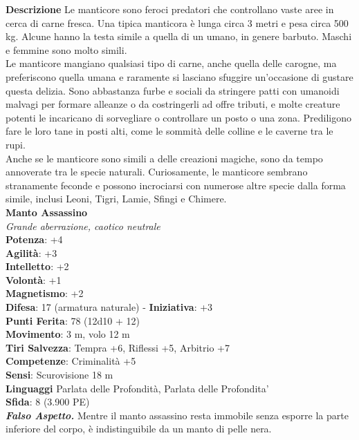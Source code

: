 \begin{multicols}{2}
\textbf{Descrizione}
Le manticore sono feroci predatori che controllano vaste aree in cerca di carne fresca. Una tipica manticora è lunga circa 3 metri e pesa circa 500 kg. Alcune hanno la testa simile a quella di un umano, in genere barbuto. Maschi e femmine sono molto simili.\\

Le manticore mangiano qualsiasi tipo di carne, anche quella delle carogne, ma preferiscono quella umana e raramente si lasciano sfuggire un’occasione di gustare questa delizia. Sono abbastanza furbe e sociali da stringere patti con umanoidi malvagi per formare alleanze o da costringerli ad offre tributi, e molte creature potenti le incaricano di sorvegliare o controllare un posto o una zona. Prediligono fare le loro tane in posti alti, come le sommità delle colline e le caverne tra le rupi.\\

Anche se le manticore sono simili a delle creazioni magiche, sono da tempo annoverate tra le specie naturali. Curiosamente, le manticore sembrano stranamente feconde e possono incrociarsi con numerose altre specie dalla forma simile, inclusi Leoni, Tigri, Lamie, Sfingi e Chimere.\\

\medskip\textbf{Manto Assassino}\\
\emph{Grande aberrazione, caotico neutrale}\\
\textbf{Potenza}: +4\\
\textbf{Agilità}: +3\\
\textbf{Intelletto}: +2\\
\textbf{Volontà}: +1\\
\textbf{Magnetismo}: +2\\
\textbf{Difesa}: 17 (armatura naturale) - \textbf{Iniziativa}: +3\\
\textbf{Punti Ferita}: 78 (12d10 + 12)\\
\textbf{Movimento}: 3 m, volo 12 m\\
\textbf{Tiri Salvezza}: Tempra +6, Riflessi +5, Arbitrio +7\\
\textbf{Competenze}: Criminalità +5\\
\textbf{Sensi}: Scurovisione 18 m \\
\textbf{Linguaggi} Parlata delle Profondità, Parlata delle Profondita'\\
\textbf{Sfida}: 8 (3.900 PE)\smallskip\\
\emph{\textbf{Falso Aspetto.}} Mentre il manto assassino resta immobile senza esporre la parte inferiore del corpo, è indistinguibile da un manto di pelle nera.\\


\end{multicols}
